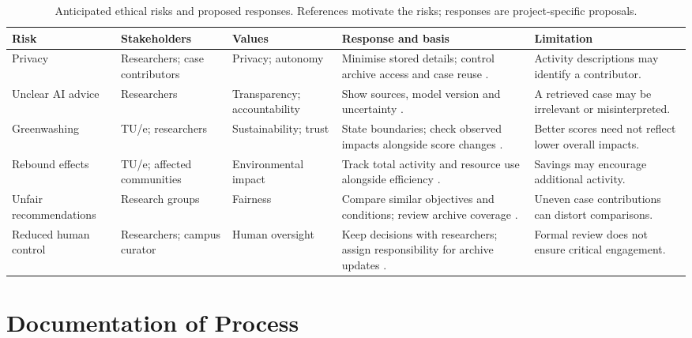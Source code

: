 \documentclass[11pt,a4paper]{article}
\renewcommand{\arraystretch}{1.15}
\begin{document}
\begin{table}[!htbp]
\centering
\caption{Anticipated ethical risks and proposed responses. References motivate the risks; responses are project-specific proposals.}
\label{tab:ethical-risks}
\footnotesize
\setlength{\tabcolsep}{4pt}
\renewcommand{\arraystretch}{1.35}
\begin{tabularx}{\textwidth}{@{}>{\raggedright\arraybackslash}p{}>{\raggedright\arraybackslash}p{}>{\raggedright\arraybackslash}p{}>{\raggedright\arraybackslash}X>{\raggedright\arraybackslash}p{}@{}}
\toprule
Risk & Stakeholders & Values & Response and basis & Limitation \\
\midrule
Privacy & Researchers; case contributors & Privacy; autonomy & Minimise stored details; control archive access and case reuse \citep{hasselbalch2025sustainability}. & Activity descriptions may identify a contributor. \\
\midrule
Unclear AI advice & Researchers & Transparency; accountability & Show sources, model version and uncertainty \citep{lacoste2019carbon}. & A retrieved case may be irrelevant or misinterpreted. \\
\midrule
Greenwashing & TU/e; researchers & Sustainability; trust & State boundaries; check observed impacts alongside score changes \citep{lin2023cost}. & Better scores need not reflect lower overall impacts. \\
\midrule
Rebound effects & TU/e; affected communities & Environmental impact & Track total activity and resource use alongside efficiency \citep{luccioni2025rebound}. & Savings may encourage additional activity. \\
\midrule
Unfair recommendations & Research groups & Fairness & Compare similar objectives and conditions; review archive coverage \citep{hasselbalch2025sustainability}. & Uneven case contributions can distort comparisons. \\
\midrule
Reduced human control & Researchers; campus curator & Human oversight & Keep decisions with researchers; assign responsibility for archive updates \citep{santoni2018control}. & Formal review does not ensure critical engagement. \\
\bottomrule
\end{tabularx}
\end{table}

\clearpage
\nocite{*}



\appendix
\clearpage
\section{Documentation of Process}
\end{document}
